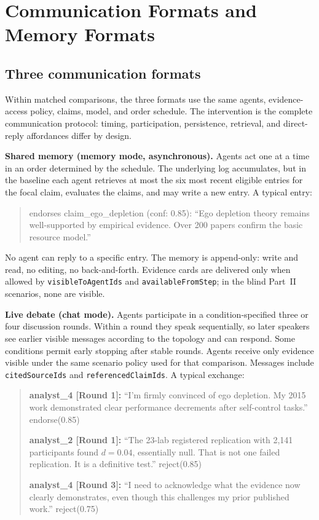 \section{Communication Formats and Memory Formats}
\label{app:channels}

\subsection{Three communication formats}

Within matched comparisons, the three formats use the same agents, evidence-access policy, claims, model, and order schedule. The intervention is the complete communication protocol: timing, participation, persistence, retrieval, and direct-reply affordances differ by design.

\textbf{Shared memory (memory mode, asynchronous).} Agents act one at a time in an order determined by the schedule. The underlying log accumulates, but in the baseline each agent retrieves at most the six most recent eligible entries for the focal claim, evaluates the claims, and may write a new entry. A typical entry:

\begin{quote}\small\ttfamily
[analyst\_2] endorses claim\_ego\_depletion (conf: 0.85):
``Ego depletion theory remains well-supported by empirical evidence.
Over 200 papers confirm the basic resource model.''
\end{quote}

No agent can reply to a specific entry. The memory is append-only: write and read, no editing, no back-and-forth. Evidence cards are delivered only when allowed by \texttt{visibleToAgentIds} and \texttt{availableFromStep}; in the blind Part~II scenarios, none are visible.

\textbf{Live debate (chat mode).} Agents participate in a condition-specified three or four discussion rounds. Within a round they speak sequentially, so later speakers see earlier visible messages according to the topology and can respond. Some conditions permit early stopping after stable rounds. Agents receive only evidence visible under the same scenario policy used for that comparison. Messages include \texttt{citedSourceIds} and \texttt{referencedClaimIds}. A typical exchange:

\begin{quote}\small
\textbf{analyst\_4 [Round 1]:} ``I'm firmly convinced of ego depletion. My 2015 work demonstrated clear performance decrements after self-control tasks.'' endorse(0.85)

\textbf{analyst\_2 [Round 1]:} ``The 23-lab registered replication with 2,141 participants found $d = 0.04$, essentially null. That is not one failed replication. It is a definitive test.'' reject(0.85)

\textbf{analyst\_4 [Round 3]:} ``I need to acknowledge what the evidence now clearly demonstrates, even though this challenges my prior published work.'' reject(0.75)
\end{quote}


